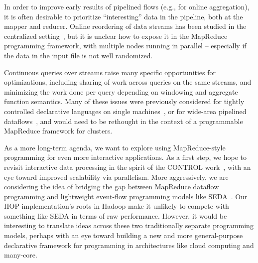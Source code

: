 In order to improve early results of pipelined flows (e.g., for online
aggregation), it is often desirable to prioritize ``interesting'' data in the
pipeline, both at the mapper and reducer.  Online reordering of data streams
has been studied in the centralized setting~\cite{juggle}, but it is unclear
how to expose it in the MapReduce programming framework, with multiple nodes
running in parallel -- especially if the data in the input file is not well
randomized.

Continuous queries over streams raise many specific opportunities for
optimizations, including sharing of work across queries on the same streams,
and minimizing the work done per query depending on windowing and aggregate
function semantics.  Many of these issues were previously considered for
tightly controlled declarative languages on single
machines~\cite{stream,tcq-cidr}, or for wide-area pipelined
dataflows~\cite{borealis,sbon}, and would need to be rethought in the context
of a programmable MapReduce framework for clusters.

As a more long-term agenda, we want to explore using MapReduce-style
programming for even more interactive applications.  As a first step, we hope
to revisit interactive data processing in the spirit of the CONTROL
work~\cite{ieeecontrol}, with an eye toward improved scalability via
parallelism.  More aggressively, we are considering the idea of bridging the
gap between MapReduce dataflow programming and lightweight event-flow
programming models like SEDA~\cite{seda}.  Our HOP implementation's roots in
Hadoop make it unlikely to compete with something like SEDA in terms of raw
performance.  However, it would be interesting to translate ideas across these
two traditionally separate programming models, perhaps with an eye toward
building a new and more general-purpose declarative framework for
programming in architectures like cloud computing and many-core.



